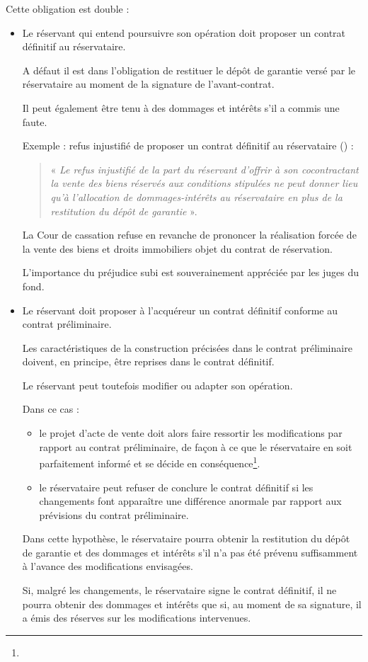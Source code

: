 					\medskip Cette obligation est double :
					\begin{itemize}
						\item Le réservant qui entend poursuivre son opération doit proposer un contrat définitif au réservataire.

							A défaut il est dans l’obligation de restituer le dépôt de garantie versé par le réservataire au moment de la signature de l’avant-contrat.

							Il peut également être tenu à des dommages et intérêts s’il a commis une faute.

							Exemple : refus injustifié de proposer un contrat définitif au réservataire ()  :
							\begin{quote}
								« {\itshape Le refus injustifié de la part du réservant d'offrir à son cocontractant la vente des biens réservés aux conditions stipulées ne peut donner lieu qu'à l'allocation de dommages-intérêts au réservataire en plus de la restitution du dépôt de garantie} ».
							\end{quote}

							La Cour de cassation refuse en revanche de prononcer la réalisation forcée de la vente des biens et droits immobiliers objet du contrat de réservation.

							L’importance du préjudice subi est souverainement appréciée par les juges du fond.


						\item Le réservant doit proposer à l’acquéreur un contrat définitif conforme au contrat préliminaire.

						Les caractéristiques de la construction précisées dans le contrat préliminaire doivent, en principe, être reprises dans le contrat définitif.

						Le réservant peut toutefois modifier ou adapter son opération.

						Dans ce cas :
						\begin{itemize}
							\item le projet d'acte de vente doit alors faire ressortir les modifications par rapport au contrat préliminaire, de façon à ce que le réservataire en soit parfaitement informé et se décide en conséquence\footnote{}.

							\item le réservataire peut refuser de conclure le contrat définitif si les changements font apparaître une différence anormale par rapport aux prévisions du contrat préliminaire.
						\end{itemize}

						Dans cette hypothèse, le réservataire pourra obtenir la restitution du dépôt de garantie et des dommages et intérêts s’il n’a pas été prévenu suffisamment à l’avance des modifications envisagées.

						Si, malgré les changements, le réservataire signe le contrat définitif, il ne pourra obtenir des dommages et intérêts que si, au moment de sa signature, il a émis des réserves sur les modifications intervenues.
					\end{itemize}


